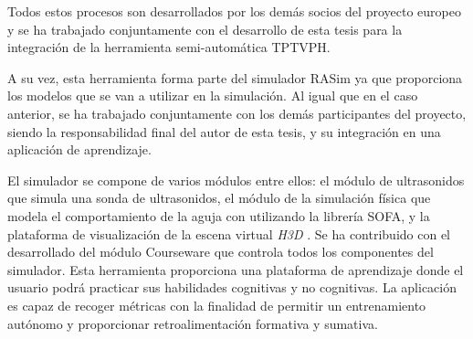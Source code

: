  Todos estos procesos son desarrollados por los demás socios del proyecto europeo y se ha trabajado conjuntamente con el desarrollo de esta tesis para la integración de la herramienta semi-automática \acs{TPTVPH}.

A su vez, esta herramienta forma parte del simulador \ac{RASim} ya que proporciona los modelos que se van a utilizar en la simulación. Al igual que en el caso anterior, se ha trabajado conjuntamente con los demás participantes del proyecto, siendo la responsabilidad final del autor de esta tesis, y su integración en una aplicación de aprendizaje.

El simulador se compone de varios módulos entre ellos: el módulo de ultrasonidos \cite{Law2015} que simula una sonda de ultrasonidos, el módulo de la simulación física que modela el comportamiento de la aguja con \cite{needleinsertion} utilizando la librería \ac{SOFA}, y la plataforma de visualización de la escena virtual \emph{H3D} \cite{sensegraphics2012open}. Se ha contribuido con el desarrollado del módulo \ac{Courseware} que controla todos los componentes del simulador. Esta herramienta proporciona una plataforma de aprendizaje donde el usuario podrá practicar sus habilidades cognitivas y no cognitivas. La aplicación es capaz de recoger métricas con la finalidad de permitir un entrenamiento autónomo y proporcionar retroalimentación formativa y sumativa.


